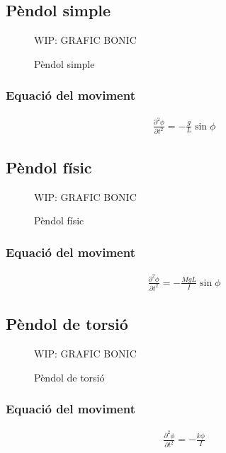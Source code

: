 \subsection{Pèndol simple}
\begin{figure}[H]
\centering
    WIP: GRAFIC BONIC 
\caption{Pèndol simple}
\end{figure}

\subsubsection*{Equació del moviment}
\begin{align}
    \boxed{\frac{\partial^{2} \phi}{\partial t^{2}} = - \frac{g}{L} \sin \phi}
\end{align}

\subsection{Pèndol físic}
\begin{figure}[H]
\centering
    WIP: GRAFIC BONIC 
\caption{Pèndol físic}
\end{figure}

\subsubsection*{Equació del moviment}
\begin{align}
    \boxed{\frac{\partial^{2} \phi}{\partial t^{2}} = - \frac{M g L}{I} \sin \phi}
\end{align}

\subsection{Pèndol de torsió}
\begin{figure}[H]
\centering
    WIP: GRAFIC BONIC 
\caption{Pèndol de torsió}
\end{figure}

\subsubsection*{Equació del moviment}
\begin{align}
    \boxed{\frac{\partial^{2} \phi}{\partial t^{2}} = - \frac{k \phi}{I}}
\end{align}

